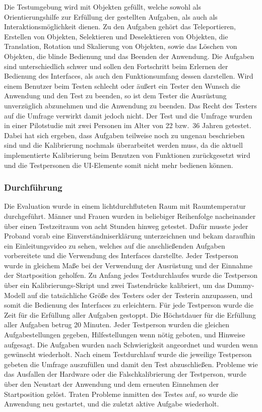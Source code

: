\noindent Die Testumgebung wird mit Objekten gefüllt, welche sowohl als Orientierungshilfe zur Erfüllung der gestellten Aufgaben, als auch als Interaktionsmöglichkeit dienen. Zu den Aufgaben gehört das Teleportieren, Erstellen von Objekten, Selektieren und Deselektieren von Objekten, die Translation, Rotation und Skalierung von Objekten, sowie das Löschen von Objekten, die blinde Bedienung und das Beenden der Anwendung. Die Aufgaben sind unterschiedlich schwer und sollen den Fortschritt beim Erlernen der Bedienung des Interfaces, als auch den Funktionsumfang dessen darstellen. Wird einem Benutzer beim Testen schlecht oder äußert ein Tester den Wunsch die Anwendung und den Test zu beenden, so ist dem Tester die Ausrüstung unverzüglich abzunehmen und die Anwendung zu beenden. Das Recht des Testers auf die Umfrage verwirkt damit jedoch nicht. Der Test und die Umfrage wurden in einer Pilotstudie mit zwei Personen im Alter von 22 bzw.~36 Jahren getestet. Dabei hat sich ergeben, dass Aufgaben teilweise noch zu ungenau beschrieben sind und die Kalibrierung nochmals überarbeitet werden muss, da die aktuell implementierte Kalibrierung beim Benutzen von Funktionen zurückgesetzt wird und die Testpersonen die UI-Elemente somit nicht mehr bedienen können.

\subsubsection{Durchführung}
Die Evaluation wurde in einem lichtdurchfluteten Raum mit Raumtemperatur durchgeführt. Männer und Frauen wurden in beliebiger Reihenfolge nacheinander über einen Testzeitraum von acht Stunden hinweg getestet. Dafür musste jeder Proband vorab eine Einverständniserklärung unterzeichnen und bekam daraufhin ein Einleitungsvideo zu sehen, welches auf die anschließenden Aufgaben vorbereitete und die Verwendung des Interfaces darstellte. Jeder Testperson wurde in gleichem Maße bei der Verwendung der Ausrüstung und der Einnahme der Startposition geholfen. Zu Anfang jedes Testdurchlaufes wurde die Testperson über ein Kalibrierungs-Skript und zwei Tastendrücke kalibriert, um das Dummy-Modell auf die tatsächliche Größe des Testers oder der Testerin anzupassen, und somit die Bedienung des Interfaces zu erleichtern. Für jede Testperson wurde die Zeit für die Erfüllung aller Aufgaben gestoppt. Die Höchstdauer für die Erfüllung aller Aufgaben betrug 20 Minuten. Jeder Testperson wurden die gleichen Aufgabestellungen gegeben, Hilfestellungen wenn nötig geboten, und Hinweise aufgesagt. Die Aufgaben wurden nach Schwierigkeit angeordnet und wurden wenn gewünscht wiederholt. Nach einem Testdurchlauf wurde die jeweilige Testperson gebeten die Umfrage auszufüllen und damit den Test abzuschließen. Probleme wie das Ausfallen der Hardware oder die Falschkalibrierung der Testperson, wurde über den Neustart der Anwendung und dem erneuten Einnehmen der Startposition gelöst. Traten Probleme inmitten des Testes auf, so wurde die Anwendung neu gestartet, und die zuletzt aktive Aufgabe wiederholt.

